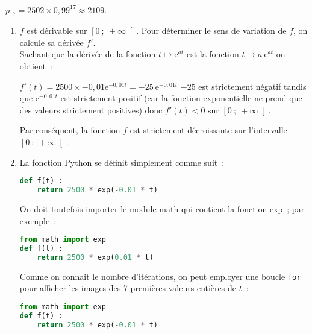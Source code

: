 \begin{corrige}
\begin{enumerate}
          $ p_{ 17 } = 2502 \times 0,99^{ 17 } \approx 2109.$
     \end{enumerate}
     \begin{enumerate}
          \item
          $f$ est dérivable sur $ \left[ 0~;~ +\infty \right[ $. Pour déterminer le sens de variation de $f$, on calcule sa dérivée $ f' $.
          \\Sachant que la dérivée de la fonction $ t \longmapsto \text{e}^{ at } $ est la fonction $ t \longmapsto a\ \text{e}^{ at }$ on obtient~:
          \par
          $f'(t)=2500 \times -0,01 \text{e}^{ -0,01t } =-25 \ \text{e}^{ -0,01t } $
          \medskip
          $ -25 $ est strictement négatif tandis que $\text{e}^{ -0,01t } $ est strictement positif (car la fonction exponentielle ne prend que des valeurs strictement positives) donc $f'(t) < 0$ sur $ \left[ 0~;~ +\infty \right[ $.
          \par
          Par conséquent, la fonction $f$ est strictement décroissante sur l'intervalle $ \left[ 0~;~ +\infty \right[ $.
          \item
          La fonction Python se définit simplement comme suit~:
\begin{lstlisting}[language=Python]
def f(t) :
    return 2500 * exp(-0.01 * t)
     \end{lstlisting}
     \par
     On doit toutefois importer le module math qui contient la fonction exp~; par exemple~:
\begin{lstlisting}[language=Python]
from math import exp
def f(t) :
    return 2500 * exp(0.01 * t)
\end{lstlisting}
\par
Comme on connait le nombre d'itérations, on peut employer une boucle \texttt{for} pour afficher les images des 7 premières valeurs entières de $t$~:
\begin{lstlisting}[language=Python]
from math import exp
def f(t) :
    return 2500 * exp(-0.01 * t)


\end{lstlisting}
\end{enumerate}
\end{corrige}

